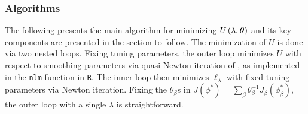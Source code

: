 \subsubsection{Algorithms}

The following presents the main algorithm for minimizing $U\left(\lambda, \mbox{\boldmath $\theta$} \right)$ and its key components are presented in the section to follow. The minimization of $U$ is done via two nested loops. Fixing tuning parameters, the outer loop minimizes $U$ with respect to smoothing parameters via quasi-Newton iteration of \cite{dennis1996numerical}, as implemented in the \texttt{nlm} function in \texttt{R}. The inner loop then minimizes $\ell_\lambda$ with fixed tuning parameters via Newton iteration. Fixing the $\theta_\beta$s in $J \left(\phi^*\right) = \sum_\beta \theta^{-1}_\beta J_\beta \left(\phi_\beta^*\right)$, the outer loop with a single $\lambda$ is straightforward. 

